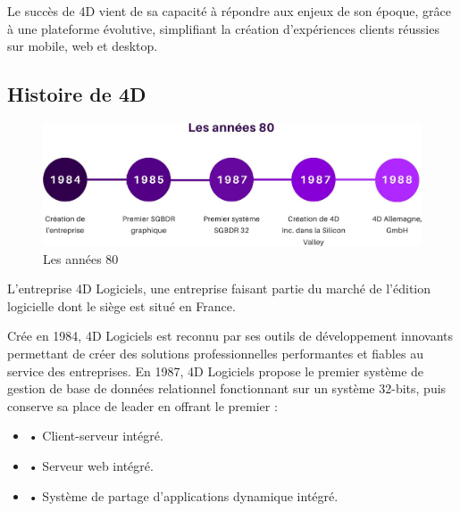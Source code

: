 Le succès de 4D vient de sa capacité à répondre aux enjeux de son époque, grâce à
une plateforme évolutive, simplifiant la création d’expériences clients réussies sur mobile,
web et desktop.\\



\subsection{Histoire de 4D}


\begin{figure}[h]
    \centering
    \includegraphics[scale=0.3]{Figures/80.jpg} %
    \caption{Les années 80}
    \label{fig:Histoire80}
\end{figure}

L’entreprise 4D Logiciels, une entreprise faisant partie du marché de l’édition logicielle
dont le siège est situé en France.
\newline



Crée en 1984, 4D Logiciels est reconnu par ses outils de développement innovants permettant de créer des solutions professionnelles performantes et fiables au service des entreprises.
En 1987, 4D Logiciels propose le premier système de gestion de base de données relationnel fonctionnant sur un système 32-bits, puis conserve sa place de leader en offrant le premier :
\begin{itemize}
    \item • Client-serveur intégré.
    \item • Serveur web intégré.
    \item • Système de partage d’applications dynamique intégré.
\end{itemize}
\vspace{1cm}

